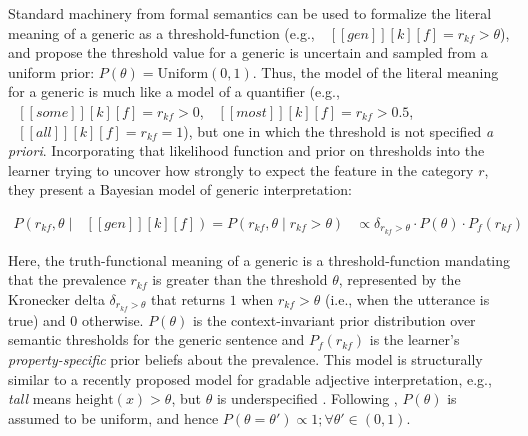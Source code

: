 \documentclass[floatsintext,doc]{apa6}
\newcommand{\denote}[1]{\mbox{ $[\![ #1 ]\!]$}}
\begin{document}
 
Standard machinery from formal semantics \cite{Montague1973} can be used to formalize the literal meaning of a generic as a threshold-function  (e.g., \(\mbox{ $[\![ gen ]\!][k][f]$} = r_{kf} > \theta\)), and  propose the threshold value for a generic is uncertain and sampled from a uniform prior: $P(\theta) = \text{Uniform}(0, 1)$. Thus, the model of the literal meaning for a generic is much like a model of a quantifier  (e.g., \(\mbox{ $[\![ some ]\!][k][f]$} = r_{kf} > 0\), \(\mbox{ $[\![ most ]\!][k][f]$} = r_{kf} > 0.5\), \(\mbox{ $[\![ all ]\!][k][f]$} = r_{kf} = 1\)), but one in which the threshold is not specified \emph{a priori}. 
Incorporating that likelihood function and prior on thresholds into the learner trying to uncover how strongly to expect the feature in the category $r$, they present a Bayesian model of generic interpretation: 

\begin{align}
P (r_{kf}, \theta \mid \denote{gen}[k][f]) = P (r_{kf}, \theta \mid r_{kf} >  \theta) &\propto \delta_{r_{kf} > \theta} \cdot P(\theta) \cdot P_f(r_{kf})  \label{eq:L0}
\end{align}


Here, the truth-functional meaning of a generic is a threshold-function mandating that the prevalence $r_{kf}$ is greater than the threshold \(\theta\), represented by the Kronecker delta $\delta_{r_{kf} > \theta}$ that returns \(1\) when \(r_{kf} > \theta\) (i.e., when the utterance is true) and \(0\) otherwise.
$P(\theta)$ is the context-invariant prior distribution over semantic thresholds for the generic sentence and $P_{f}(r_{kf})$ is the learner's \emph{property-specific} prior beliefs about the prevalence.
This model is structurally similar to a recently proposed model for gradable adjective interpretation, e.g., \emph{tall} means $\text{height}(x) > \theta$, but $\theta$ is underspecified \cite{Lassiter2015}.
Following , $P(\theta)$ is assumed to be uniform, and hence $P(\theta = \theta') \propto 1; \forall \theta' \in (0, 1)$. 
\end{document}
